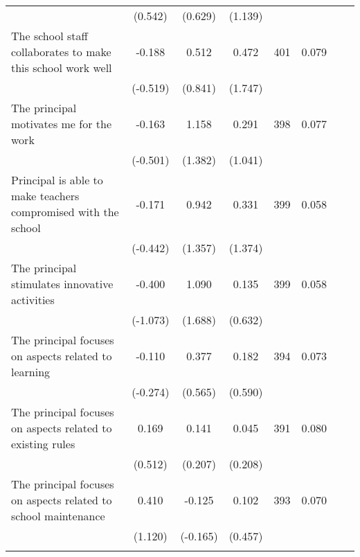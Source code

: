 \documentclass[a4paper, 12pt]{article}
\begin{document}
{\begin{longtable}{@{\extracolsep{1pt}}l*{7}{c}@{}}
\begin{adjustbox}{max width=\textwidth}
\begin{tabular}{l*{5}{c}}
            &     (0.542)         &     (0.629)         &     (1.139)         &              &              \\
The school staff collaborates to make this school work well      &      -0.188         &       0.512         &       0.472         &     401         &      0.079  \\
            &     (-0.519)         &     (0.841)         &     (1.747)         &              &              \\
The principal motivates me for the work      &      -0.163         &       1.158         &       0.291         &    398         &   0.077   \\
            &     (-0.501)         &     (1.382)         &     (1.041)         &              &              \\
Principal is able to make teachers compromised with the school      &      -0.171         &       0.942         &       0.331         &     399         &  0.058    \\
            &     (-0.442)         &     (1.357)         &     (1.374)         &              &              \\
The principal stimulates innovative activities      &      -0.400         &       1.090         &       0.135         &     399         &  0.058    \\
            &     (-1.073)         &     (1.688)         &     (0.632)         &             &              \\
The principal focuses on aspects related to learning      &      -0.110         &       0.377         &       0.182         &      394         &  0.073    \\
            &     (-0.274)         &     (0.565)         &     (0.590)         &              &             \\
The principal focuses on aspects related to existing rules     &       0.169         &       0.141         &      0.045         &     391         &  0.080   \\
            &     (0.512)         &     (0.207)         &     (0.208)         &              &              \\
The principal focuses on aspects related to school maintenance     &       0.410         &      -0.125         &       0.102         &     393         &      0.070         \\
            &     (1.120)         &     (-0.165)         &     (0.457)         &             &              \\

\end{tabular}
\end{adjustbox}
\end{longtable}}
\end{document}
